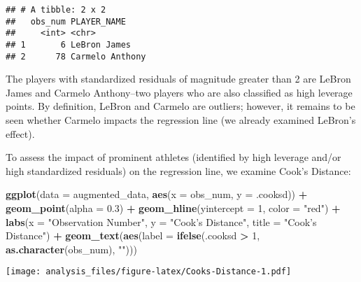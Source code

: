 \documentclass[]{article}
\newenvironment{Shaded}{\begin{snugshade}}{\end{snugshade}}
\newcommand{\DataTypeTok}[1]{\textcolor[rgb]{0.13,0.29,0.53}{#1}}
\newcommand{\DecValTok}[1]{\textcolor[rgb]{0.00,0.00,0.81}{#1}}
\newcommand{\FloatTok}[1]{\textcolor[rgb]{0.00,0.00,0.81}{#1}}
\newcommand{\KeywordTok}[1]{\textcolor[rgb]{0.13,0.29,0.53}{\textbf{#1}}}
\newcommand{\NormalTok}[1]{#1}
\newcommand{\OperatorTok}[1]{\textcolor[rgb]{0.81,0.36,0.00}{\textbf{#1}}}
\newcommand{\StringTok}[1]{\textcolor[rgb]{0.31,0.60,0.02}{#1}}
\begin{document}
\begin{verbatim}
## # A tibble: 2 x 2
##   obs_num PLAYER_NAME    
##     <int> <chr>          
## 1       6 LeBron James   
## 2      78 Carmelo Anthony
\end{verbatim}

The players with standardized residuals of magnitude greater than 2 are
LeBron James and Carmelo Anthony--two players who are also classified as
high leverage points. By definition, LeBron and Carmelo are outliers;
however, it remains to be seen whether Carmelo impacts the regression
line (we already examined LeBron's effect).

To assess the impact of prominent athletes (identified by high leverage
and/or high standardized residuals) on the regression line, we examine
Cook's Distance:

\begin{Shaded}
\begin{Highlighting}[]
\KeywordTok{ggplot}\NormalTok{(}\DataTypeTok{data =}\NormalTok{ augmented_data, }\KeywordTok{aes}\NormalTok{(}\DataTypeTok{x =}\NormalTok{ obs_num, }\DataTypeTok{y =}\NormalTok{ .cooksd)) }\OperatorTok{+}\StringTok{ }
\StringTok{  }\KeywordTok{geom_point}\NormalTok{(}\DataTypeTok{alpha =} \FloatTok{0.3}\NormalTok{) }\OperatorTok{+}\StringTok{ }
\StringTok{  }\KeywordTok{geom_hline}\NormalTok{(}\DataTypeTok{yintercept =} \DecValTok{1}\NormalTok{, }\DataTypeTok{color =} \StringTok{"red"}\NormalTok{) }\OperatorTok{+}
\StringTok{  }\KeywordTok{labs}\NormalTok{(}\DataTypeTok{x =} \StringTok{"Observation Number"}\NormalTok{,}
       \DataTypeTok{y =} \StringTok{"Cook's Distance"}\NormalTok{,}
       \DataTypeTok{title =} \StringTok{"Cook's Distance"}\NormalTok{) }\OperatorTok{+}
\StringTok{  }\KeywordTok{geom_text}\NormalTok{(}\KeywordTok{aes}\NormalTok{(}\DataTypeTok{label =} \KeywordTok{ifelse}\NormalTok{(.cooksd }\OperatorTok{>}\StringTok{ }\DecValTok{1}\NormalTok{, }\KeywordTok{as.character}\NormalTok{(obs_num), }\StringTok{""}\NormalTok{)))}
\end{Highlighting}
\end{Shaded}

\texttt{[image: analysis\_files/figure-latex/Cooks-Distance-1.pdf]}

\begin{Shaded}
\end{Shaded}
\end{document}
